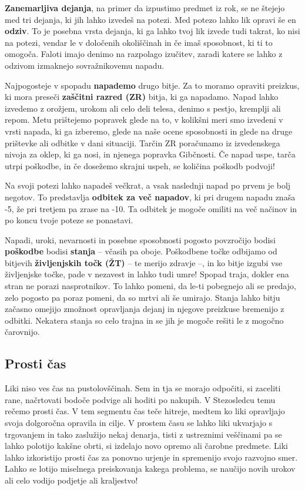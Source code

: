 \textbf{Zanemarljiva dejanja}, na primer da izpustimo predmet iz rok, se ne štejejo med tri dejanja, ki jih lahko izvedeš na potezi. Med potezo lahko lik opravi še en \textbf{odziv}. To je posebna vrsta dejanja, ki ga lahko tvoj lik izvede tudi takrat, ko nisi na potezi, vendar le v določenih okoliščinah in če imaš sposobnost, ki ti to omogoča. Faloti imajo denimo na razpolago izučitev, zaradi katere se lahko z odzivom izmaknejo sovražnikovemu napadu.

Najpogosteje v spopadu \textbf{napademo} drugo bitje. Za to moramo opraviti preizkus, ki mora preseči \textbf{zaščitni razred (ZR)} bitja, ki ga napadamo. Napad lahko izvedemo z orožjem, urokom ali celo deli telesa, denimo s pestjo, kremplji ali repom. Metu prištejemo popravek glede na to, v kolikšni meri smo izvedeni v vrsti napada, ki ga izberemo, glede na naše ocene sposobnosti in glede na druge prištevke ali odbitke v dani situaciji. Tarčin ZR poračunamo iz izvedenskega nivoja za oklep, ki ga nosi, in njenega popravka Gibčnosti. Če napad uspe, tarča utrpi poškodbe, in če dosežemo skrajni uspeh, se količina poškodb podvoji!

Na svoji potezi lahko napadeš večkrat, a vsak naslednji napad po prvem je bolj negotov. To predstavlja \textbf{odbitek za več napadov}, ki pri drugem napadu znaša -5, že pri tretjem pa zrase na -10. Ta odbitek je mogoče omiliti na več načinov in po koncu tvoje poteze se ponastavi.


Napadi, uroki, nevarnosti in posebne sposobnosti pogosto povzročijo bodisi \textbf{poškodbe} bodisi \textbf{stanja} -- včasih pa oboje. Poškodbene točke odbijamo od bitjevih \textbf{življenjskih točk (ŽT)} -- te merijo zdravje --, in ko bitje izgubi vse življenjske točke, pade v nezavest in lahko tudi umre! Spopad traja, dokler ena stran ne porazi nasprotnikov. To lahko pomeni, da le-ti pobegnejo ali se predajo, zelo pogosto pa poraz pomeni, da so mrtvi ali še umirajo. Stanja lahko bitju začasno omejijo zmožnost opravljanja dejanj in njegove preizkuse bremenijo z odbitki. Nekatera stanja so celo trajna in se jih je mogoče rešiti le z mogočno čarovnijo.

\subsection{Prosti čas}
Liki niso ves čas na pustolovščinah. Sem in tja se morajo odpočiti, si zaceliti rane, načrtovati bodoče podvige ali hoditi po nakupih. V Stezosledcu temu rečemo prosti čas. V tem segmentu čas teče hitreje, medtem ko liki opravljajo svoja dolgoročna opravila in cilje. V prostem času se lahko liki ukvarjajo s trgovanjem in tako zaslužijo nekaj denarja, tisti z ustreznimi veščinami pa se lahko polotijo kakšne obrti, si izdelajo novo opremo ali čarobne predmete. Liki lahko izkoristijo prosti čas za ponovno urjenje in spremenijo svojo razvojno smer. Lahko se lotijo miselnega preiskovanja kakega problema, se naučijo novih urokov ali celo vodijo podjetje ali kraljestvo!

